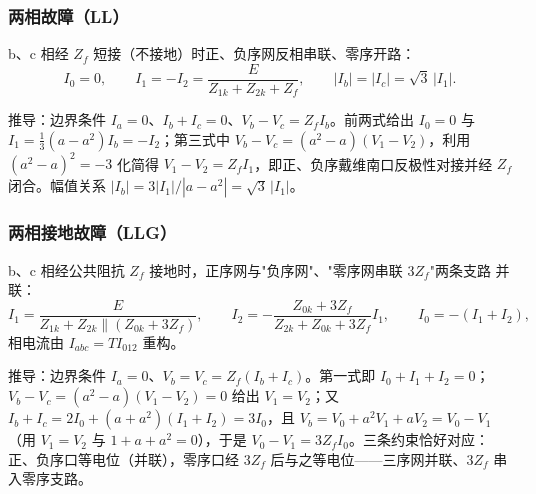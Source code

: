 \subsubsection{两相故障（LL）}
\begin{proposition}
b、c 相经 $Z_f$ 短接（不接地）时正、负序网反相串联、零序开路：
\begin{equation}
I_0=0,\qquad I_1=-I_2=\frac{E}{Z_{1k}+Z_{2k}+Z_f},\qquad
|I_b|=|I_c|=\sqrt3\,|I_1|.
\end{equation}
\end{proposition}
推导：边界条件 $I_a=0$、$I_b+I_c=0$、$V_b-V_c=Z_f I_b$。前两式给出 $I_0=0$ 与
$I_1=\frac13(a-a^2)I_b=-I_2$；第三式中 $V_b-V_c=(a^2-a)(V_1-V_2)$，利用
$(a^2-a)^2=-3$ 化简得 $V_1-V_2=Z_f I_1$，即正、负序戴维南口反极性对接并经 $Z_f$
闭合。幅值关系 $|I_b|=3|I_1|/|a-a^2|=\sqrt3\,|I_1|$。

\subsubsection{两相接地故障（LLG）}
\begin{proposition}
b、c 相经公共阻抗 $Z_f$ 接地时，正序网与"负序网"、"零序网串联 $3Z_f$"两条支路
并联：
\begin{equation}
I_1=\frac{E}{Z_{1k}+Z_{2k}\parallel(Z_{0k}+3Z_f)},\qquad
I_2=-\frac{Z_{0k}+3Z_f}{Z_{2k}+Z_{0k}+3Z_f}I_1,\qquad
I_0=-(I_1+I_2),
\end{equation}
相电流由 $I_{abc}=TI_{012}$ 重构。
\end{proposition}
推导：边界条件 $I_a=0$、$V_b=V_c=Z_f(I_b+I_c)$。第一式即 $I_0+I_1+I_2=0$；
$V_b-V_c=(a^2-a)(V_1-V_2)=0$ 给出 $V_1=V_2$；又
$I_b+I_c=2I_0+(a+a^2)(I_1+I_2)=3I_0$，且
$V_b=V_0+a^2V_1+aV_2=V_0-V_1$（用 $V_1=V_2$ 与 $1+a+a^2=0$），于是
$V_0-V_1=3Z_f I_0$。三条约束恰好对应：正、负序口等电位（并联），零序口经 $3Z_f$
后与之等电位——三序网并联、$3Z_f$ 串入零序支路。

